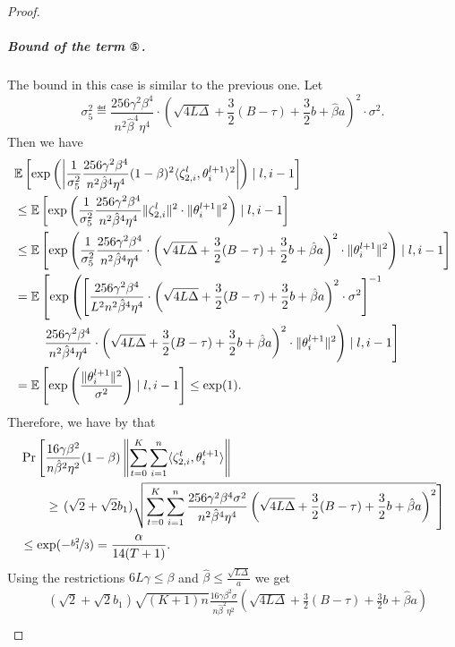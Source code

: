 \documentclass[a4paper,11pt]{article}
\begin{document}
\begin{proof}
    \subparagraph{Bound of the term $\circledFive$.} The bound in this case is similar to the previous one. 
    Let 
    \[
    \sigma_5^2 \eqdef \frac{256\gamma^2\beta^4}{n^2\hat{\beta}^4\eta^4}\cdot \left(\sqrt{4L\Delta} + \frac{3}{2}(B-\tau)+\frac{3}{2}b + \hat{\beta}a\right)^2\cdot \sigma^2.
    \]
    Then we have 
    \begin{align*}
    &\E{\exp\left(\left|\frac{1}{\sigma_5^2}\frac{256\gamma^2\beta^4}{n^2\hat{\beta}^4\eta^4}(1-\beta)^2\<\zeta^l_{2,i},\theta^{l+1}_i>^2\right|\right)\mid l,i-1} \\
    &\le 
    \E{\exp\left(\frac{1}{\sigma^2_5}\frac{256\gamma^2\beta^4}{n^2\hat{\beta}^4\eta^4}\|\zeta_{2,i}^l\|^2 \cdot \|\theta^{l+1}_i\|^2\right)\mid l,i-1}\\
    &\le \E{\exp\left(\frac{1}{\sigma_5^2}\frac{256\gamma^2 \beta^4}{n^2\hat{\beta}^4\eta^4}\cdot \left(\sqrt{4L\Delta} + \frac{3}{2}(B-\tau)+\frac{3}{2}b+\hat{\beta}a\right)^2\cdot \|\theta^{l+1}_i\|^2\right) \mid l,i-1}\\
    &= \mathbb{E}\left[\exp\left( \left[\frac{256\gamma^2\beta^4}{L^2n^2\hat{\beta}^4\eta^4}\cdot \left(\sqrt{4L\Delta} + \frac{3}{2}(B-\tau)+\frac{3}{2}b+\hat{\beta}a\right)^2\cdot \sigma^2\right]^{-1}\right.\right.\\
    &\qquad \left.\left. \frac{256\gamma^2\beta^4}{n^2\hat{\beta}^4\eta^4}\cdot \left(\sqrt{4L\Delta} + \frac{3}{2}(B-\tau)+\frac{3}{2}b+\hat{\beta}a\right)^2\cdot \|\theta^{l+1}_i\|^2\right) \mid l,i-1\right]\\
    &= \E{\exp\left(\frac{\|\theta^{l+1}_i\|^2}{\sigma^2}\right) \mid l,i-1} \le \exp(1).
    \end{align*}
    Therefore, we have by  that 
    \begin{align*}
    &\Pr\left[\frac{16\gamma\beta^2}{n\hat{\beta}^2\eta^2}(1-\beta)\left\|\sum_{t=0}^K\sum_{i=1}^n\<\zeta_{2,i}^t,\theta^{t+1}_i>\right\|\right.\\ 
    &\qquad  \ge \left. (\sqrt{2}+\sqrt{2}b_1)\sqrt{\sum_{t=0}^K\sum_{i=1}^n \frac{256\gamma^2\beta^4\sigma^2}{n^2\hat{\beta}^4\eta^4}\left(\sqrt{4L\Delta} + \frac{3}{2}(B-\tau)+\frac{3}{2}b+\hat{\beta}a\right)^2}\right]\\ 
    &\le \exp(-\nicefrac{b_1^2}{3}) = \frac{\alpha}{14(T+1)}.
    \end{align*}
    Using the restrictions $6L\gamma \le \beta$ and $\hat{\beta} \le\frac{\sqrt{L\Delta}}{a}$ we get 
    \begin{align*}
    &(\sqrt{2}+\sqrt{2}b_1)\sqrt{(K+1)n}\frac{16\gamma\beta^2\sigma}{n\hat{\beta}^2\eta^2}\left(\sqrt{4L\Delta} + \frac{3}{2}(B-\tau)+\frac{3}{2}b+\hat{\beta}a\right)\\

\end{align*}
\end{proof}
\end{document}
